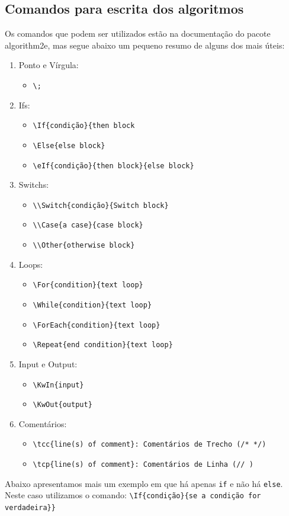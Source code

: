 \subsection{Comandos para escrita dos algoritmos}
Os comandos que podem ser utilizados estão na documentação do pacote {\ttfamily algorithm2e}, mas segue abaixo um pequeno resumo de alguns dos mais úteis:
\begin{enumerate}
    \item Ponto e Vírgula:
    \begin{itemize}
        \item \verb#\;#
    \end{itemize}
    \item Ifs:
    \begin{itemize}
        \item \verb#\If{condição}{then block#
        \item \verb#\Else{else block}#
\item \verb#\eIf{condição}{then block}{else block}#
    \end{itemize}
    \item Switchs:
    \begin{itemize}
        \item \verb#\\Switch{condição}{Switch block}#
        \item \verb#\\Case{a case}{case block}#
        \item \verb#\\Other{otherwise block}#
    \end{itemize}
    \item Loops:
    \begin{itemize}
        \item \verb#\For{condition}{text loop}#
    \item \verb#\While{condition}{text loop}#
    \item \verb#\ForEach{condition}{text loop}#
    \item \verb#\Repeat{end condition}{text loop}#
    \end{itemize}
    \item Input e Output:
    \begin{itemize}
        \item \verb#\KwIn{input}#
\item \verb#\KwOut{output}#
    \end{itemize}
    \item Comentários:
    \begin{itemize}
        \item \verb#\tcc{line(s) of comment}: Comentários de Trecho (/* */)#
    \item \verb#\tcp{line(s) of comment}: Comentários de Linha (// )#
    \end{itemize}
\end{enumerate}



Abaixo apresentamos mais um exemplo em que há apenas \verb#if# e não há \verb#else#. Neste caso utilizamos o comando: \verb#\If{condição}{se a condição for verdadeira}}#\\

